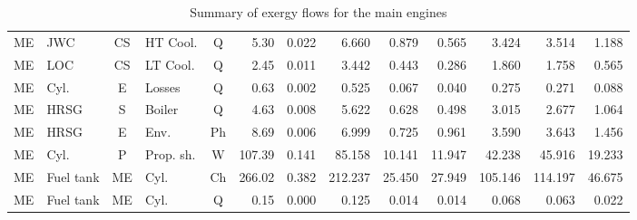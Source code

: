 \documentclass[preprint,12pt]{elsarticle}
\begin{document}
\begin{table}[hbp!]
{\begin{tabular}{clclcrrrrrrrr}
ME & JWC & CS & HT Cool. & Q & 5.30 & 0.022 & 6.660 & 0.879 & 0.565 & 3.424 & 3.514 & 1.188\\
ME & LOC & CS & LT Cool. & Q & 2.45 & 0.011 & 3.442 & 0.443 & 0.286 & 1.860 & 1.758 & 0.565\\
ME & Cyl. & E & Losses & Q & 0.63 & 0.002 & 0.525 & 0.067 & 0.040 & 0.275 & 0.271 & 0.088\\
ME & HRSG & S & Boiler & Q & 4.63 & 0.008 & 5.622 & 0.628 & 0.498 & 3.015 & 2.677 & 1.064\\
ME & HRSG & E & Env. & Ph & 8.69 & 0.006 & 6.999 & 0.725 & 0.961 & 3.590 & 3.643 & 1.456\\
ME & Cyl. & P & Prop. sh. & W & 107.39 & 0.141 & 85.158 & 10.141 & 11.947 & 42.238 & 45.916 & 19.233\\
ME & Fuel tank & ME & Cyl. & Ch & 266.02 & 0.382 & 212.237 & 25.450 & 27.949 & 105.146 & 114.197 & 46.675\\
ME & Fuel tank & ME & Cyl. & Q & 0.15 & 0.000 & 0.125 & 0.014 & 0.014 & 0.068 & 0.063 & 0.022\\
\bottomrule
\end{tabular}}
\caption{Summary of exergy flows for the main engines}
\label{tab:flows:ex:ME}
\end{table}
\end{document}
